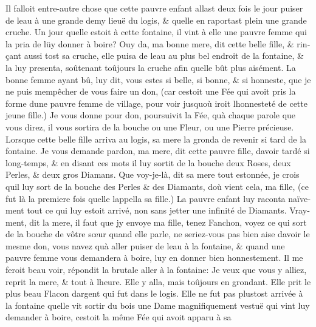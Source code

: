\documentclass[14pt,a4paper]{memoir}
\begin{document}
{{\begin{otherlanguage}{french}
Il falloit entre-autre chose que cette pauvre enfant allast deux fois le
jour puiser de l\textquotesingle eau à une grande demy lieuë du logis,
\& qu\textquotesingle elle en raportast plein une grande cruche. Un jour
qu\textquotesingle elle estoit à cette fontaine, il vint à elle une
pauvre femme qui la pria de lüy donner à boire? Ouy da, ma bonne mere,
dit cette belle fille, \& rinçant aussi tost sa cruche, elle puisa de
l\textquotesingle eau au plus bel endroit de la fontaine, \& la luy
presenta, soûtenant toûjours la cruche afin qu\textquotesingle elle bût
plus aisément. La bonne femme ayant bû, luy dit, vous estes si belle, si
bonne, \& si honneste, que je ne puis m\textquotesingle empêcher de vous
faire un don, (car c\textquotesingle estoit une Fée qui avoit pris la
forme d\textquotesingle une pauvre femme de village, pour voir
jusqu\textquotesingle où iroit l\textquotesingle honnesteté de cette
jeune fille.) Je vous donne pour don, poursuivit la Fée,
qu\textquotesingle à chaque parole que vous direz, il vous sortira de la
bouche ou une Fleur, ou une Pierre précieuse. Lorsque cette belle fille
arriva au logis, sa mere la gronda de revenir si tard de la fontaine. Je
vous demande pardon, ma mere, dit cette pauvre fille,
d\textquotesingle avoir tardé si long-temps, \& en disant ces mots il
luy sortit de la bouche deux Roses, deux Perles, \& deux gros Diamans.
Que voy-je-là, dit sa mere tout estonnée, je crois qu\textquotesingle il
luy sort de la bouche des Perles \& des Diamants, d\textquotesingle où
vient cela, ma fille, (ce fut là la premiere fois
qu\textquotesingle elle l\textquotesingle appella sa fille.) La pauvre
enfant luy raconta naïvement tout ce qui luy estoit arrivé, non sans
jetter une infinité de Diamants. Vrayment, dit la mere, il faut que
j\textquotesingle y envoye ma fille, tenez Fanchon, voyez ce qui sort de
la bouche de vôtre sœur quand elle parle, ne seriez-vous pas bien aise
d\textquotesingle avoir le mesme don, vous n\textquotesingle avez
qu\textquotesingle à aller puiser de l\textquotesingle eau à la
fontaine, \& quand une pauvre femme vous demandera à boire, luy en
donner bien honnestement. Il me feroit beau voir, répondit la brutale
aller à la fontaine: Je veux que vous y alliez, reprit la mere, \& tout
à l\textquotesingle heure. Elle y alla, mais toûjours en grondant. Elle
prit le plus beau Flacon d\textquotesingle argent qui fut dans le logis.
Elle ne fut pas plustost arrivée à la fontaine qu\textquotesingle elle
vit sortir du bois une Dame magnifiquement vestuë qui vint luy demander
à boire, c\textquotesingle estoit la même Fée qui avoit apparu à sa

\end{otherlanguage}}}
\end{document}
